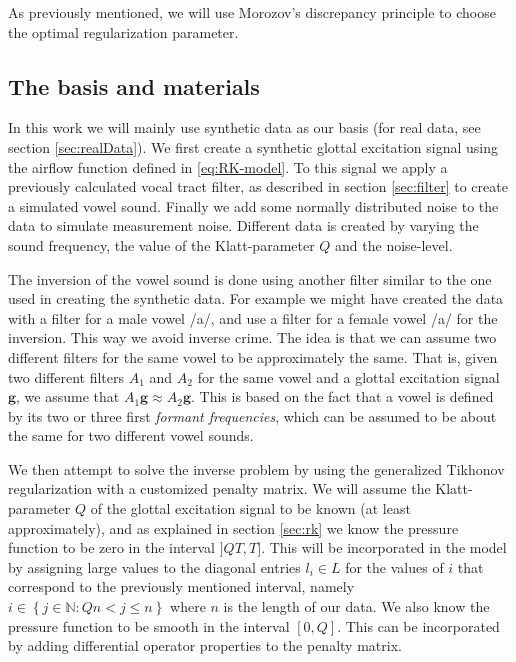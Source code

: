 \documentclass[12pt,a4]{article}
\newcommand{\N}{{\mathbb N}}
\newcommand{\vc}[1]{\ensuremath{\bm{#1}}}
\begin{document}
As previously mentioned, we will use Morozov's discrepancy principle to choose the optimal regularization parameter.

\subsection{The basis and materials}
\label{sec:basis}

In this work we will mainly use synthetic data as our basis (for real data, see section \ref{sec:realData}). We first create a synthetic glottal excitation signal using the airflow function defined in \eqref{eq:RK-model}. To this signal we apply a previously calculated vocal tract filter, as described in section \ref{sec:filter} to create a simulated vowel sound. Finally we add some normally distributed noise to the data to simulate measurement noise. Different data is created by varying the sound frequency, the value of the Klatt-parameter $Q$ and the noise-level.

The inversion of the vowel sound is done using another filter similar to the one used in creating the synthetic data. For example we might have created the data with a filter for a male vowel /a/, and use a filter for a female vowel /a/ for the inversion. This way we avoid inverse crime. The idea is that we can assume two different filters for the same vowel to be approximately the same. That is, given two different filters $A_1$ and $A_2$ for the same vowel and a glottal excitation signal $\vc{g}$, we assume that $A_1 \vc{g} \approx A_2 \vc{g}$. This is based on the fact that a vowel is defined by its two or three first \emph{formant frequencies}, which can be assumed to be about the same for two different vowel sounds.\cite{digitalmodels}

We then attempt to solve the inverse problem by using the generalized Tikhonov regularization with a customized penalty matrix. We will assume the Klatt-parameter $Q$ of the glottal excitation signal to be known (at least approximately), and as explained in section \ref{sec:rk} we know the pressure function to be zero in the interval $]QT, T]$. This will be incorporated in the model by assigning large values to the diagonal entries $l_i \in L$ for the values of $i$ that correspond to the previously mentioned interval, namely $i \in \left\{ j \in \N : Qn < j \leq n \right\}$ where $n$ is the length of our data. We also know the pressure function to be smooth in the interval $[0, Q]$. This can be incorporated by adding differential operator properties to the penalty matrix.
\end{document}
